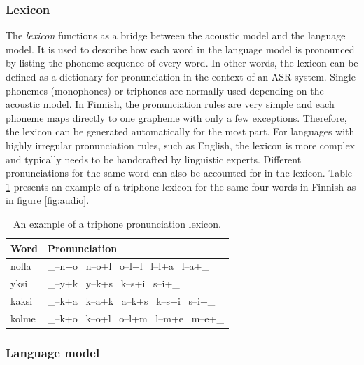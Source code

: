 \documentclass[english, 12pt, a4paper, pdftex, elec, utf8]{aaltothesis}
\begin{document}
\subsubsection{Lexicon}

The \textit{lexicon} functions as a bridge between the acoustic model and the language model. It is used to describe how each word in the language model is pronounced by listing the phoneme sequence of every word. In other words, the lexicon can be defined as a dictionary for pronunciation in the context of an ASR system. Single phonemes (monophones) or triphones are normally used depending on the acoustic model. In Finnish, the pronunciation rules are very simple and each phoneme maps directly to one grapheme with only a few exceptions. Therefore, the lexicon can be generated automatically for the most part. For languages with highly irregular pronunciation rules, such as English, the lexicon is more complex and typically needs to be handcrafted by linguistic experts. Different pronunciations for the same word can also be accounted for in the lexicon. Table \ref{table:triphone} presents an example of a triphone lexicon for the same four words in Finnish as in figure \ref{fig:audio}. \\
\begin{table}[h]
    \renewcommand{\arraystretch}{1.2}  %
    \setlength{\tabcolsep}{20pt}       %
    \centering
    \caption{An example of a triphone pronunciation lexicon.}
    \label{table:triphone}
    \begin{tabular}{@{}ll@{}}
        \toprule
        \textbf{Word}  & \textbf{Pronunciation}              \\ \midrule
        nolla & \_--n+o \ n--o+l \ o--l+l \ l--l+a \ l--a+\_ \\
        yksi  & \_--y+k \ y--k+s \ k--s+i \ s--i+\_          \\
        kaksi & \_--k+a \ k--a+k \ a--k+s \ k--s+i \ s--i+\_ \\
        kolme & \_--k+o \ k--o+l \ o--l+m \ l--m+e \ m--e+\_ \\ \bottomrule
    \end{tabular}
\end{table}

\subsubsection{Language model}
\end{document}
